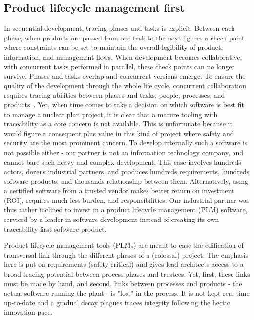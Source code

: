 \subsection{Product lifecycle management first}
In sequential development, tracing phases and tasks is explicit. Between each phase, when products are passed from one task to the next figures a check point where constraints can be set to maintain the overall legibility of product, information, and management flows. 
When development becomes collaborative, with concurrent tasks performed in parallel, these check points can no longer survive. Phases and tasks overlap and concurrent versions emerge.
To ensure the quality of the development through the whole life cycle, concurrent collaboration requires tracing abilities between phases and tasks, people, processes, and products~\cite{ghaisas2019-traceability-for-a-knowledge-driven-SW}. 
Yet, when time comes to take a decision on which software is best fit to manage a nuclear plan project, it is clear that a mature tooling with traceability as a core concern is not available. This is unfortunate because it would figure a consequent plus value in this kind of project where safety and security are the most prominent concern. 
To develop internally such a software is not possible either - our partner is not an information technology company, and cannot bare such heavy and complex development. This case involves hundreds actors, dozens industrial partners, and produces hundreds requirements, hundreds software products, and thousands relationship between them.
Alternatively, using a certified software from a trusted vendor makes better return on investment (ROI), requires much less burden, and responsibilities.
Our industrial partner was thus rather inclined to invest in a product lifecycle management (PLM) software, serviced by a leader in software development instead of creating its own traceability-first software product. 

Product lifecycle management tools (PLMs) are meant to ease the edification of transversal link through the different phases of a (colossal) project. 
The emphasis here is put on requirements (safety critical) and gives lead architects access to a broad tracing potential between process phases and trustees. Yet, first, these links must be made by hand, and second, links between processes and products - the actual software running the plant - is "lost" in the process. It is not kept real time up-to-date and a gradual decay plagues traces integrity following the hectic innovation pace.

